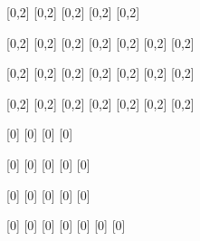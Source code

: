 \documentclass{standalone}
\begin{document}
  \begin{cartonaugh}[4][2][1]
    [0,2]
    [0,2]
    [0,2]
    [0,2]
    [0,2]
  \end{cartonaugh}
  \begin{cartonaugh}[4][4][1]
    [0,2]
    [0,2]
    [0,2]
    [0,2]
    [0,2]
    [0,2]
    [0,2]
  \end{cartonaugh}
  \begin{cartonaugh}[4][4][2]
    [0,2]
    [0,2]
    [0,2]
    [0,2]
    [0,2]
    [0,2]
    [0,2]
  \end{cartonaugh}
  \begin{cartonaugh}[4][4][4]
    [0,2]
    [0,2]
    [0,2]
    [0,2]
    [0,2]
    [0,2]
    [0,2]
  \end{cartonaugh}
  \begin{cartonaugh}[2][2][1]
    [0]
    [0]
    [0]
    [0]
  \end{cartonaugh}
  \begin{cartonaugh}[2][4][1]
    [0]
    [0]
    [0]
    [0]
    [0]
  \end{cartonaugh}
  \begin{cartonaugh}[4][2][1]
    [0]
    [0]
    [0]
    [0]
    [0]
  \end{cartonaugh}
  \begin{cartonaugh}[4][4][1]
    [0]
    [0]
    [0]
    [0]
    [0]
    [0]
    [0]
  \end{cartonaugh}
\end{document}
